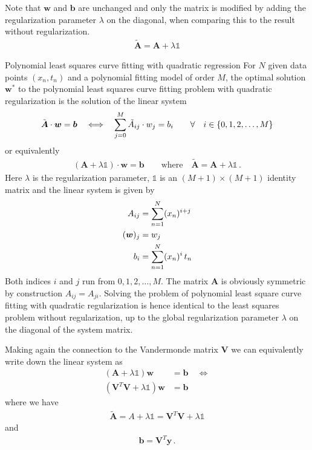 \documentclass[11pt,DINA4, fleqn]{amsart}
\def\vw{\boldsymbol{w}\xspace}
\def\vb{\boldsymbol{b}\xspace}
\def\vy{\boldsymbol{y}\xspace}
\def\mA{\boldsymbol{A}\xspace}
\def\mV{\boldsymbol{V}\xspace}
\begin{document}
Note that $\vw$ and $\vb$ are unchanged and only the matrix is modified by adding the regularization parameter $\lambda$ on the diagonal, when comparing this to the result without regularization.
\begin{align}
\tilde{\mA} = \mA  + \lambda \mathds{1}
\end{align}

\begin{mybox_tc3}{Polynomial least squares curve fitting with quadratic regression}
	For $N$ given data points $(x_n, t_n)$ and a polynomial fitting model of order $M$,
	the optimal solution $\vw^*$ to the polynomial least squares curve fitting problem with quadratic regularization is the solution of the linear system
	\begin{align}
	\tilde{\mA} \cdot \vw = \vb \quad \Longleftrightarrow \quad \sum \displaylimits_{j = 0}^{M} \tilde{A}_{ij} \cdot w_j = b_i  \qquad \forall\quad i \in \{0, 1, 2, \dotsc, M\}
	\end{align}
	or equivalently
	\begin{align}
	(\mA + \lambda \mathds{1}) \cdot \vw = \vb \qquad \text{where} \quad \tilde{\mA} = \mA + \lambda \mathds{1} \, .
	\end{align}
	Here $\lambda$ is the regularization parameter, $\mathds{1}$ is an $(M+1) \times (M+1)$ identity matrix and the linear system is given by
	\begin{align}
	A_{ij} &= \sum \displaylimits_{n = 1}^{N} (x_n)^{i + j} \\
	(\vw)_j &= w_j \\
	b_i &= \sum \displaylimits_{n = 1}^{N} (x_n)^{i} \, t_n
	\end{align}
	Both indices $i$ and $j$ run from $0, 1, 2, \dotsc, M$.
	The matrix $\mA$ is obviously symmetric by construction $A_{ij} = A_{ji}$.
	Solving the problem of polynomial least square curve fitting with quadratic regularization is hence identical to the least squares problem without regularization, up to the global regularization parameter $\lambda$ on the diagonal of the system matrix. 
\end{mybox_tc3}

Making again the connection to the Vandermonde matrix $\mV$ we can equivalently write down the linear system as
\begin{align}
(\mA + \lambda \mathds{1}) \vw &=  \vb \quad \Longleftrightarrow \\
(\mV^T \mV + \lambda \mathds{1}) \vw &=  \vb
\end{align}
where we have
\begin{align}
\tilde{\mA} = A + \lambda \mathds{1} = \mV^T\mV + \lambda \mathds{1}
\end{align}
and
\begin{align}
\vb = \mV^T \vy \, .
\end{align}
\end{document}
